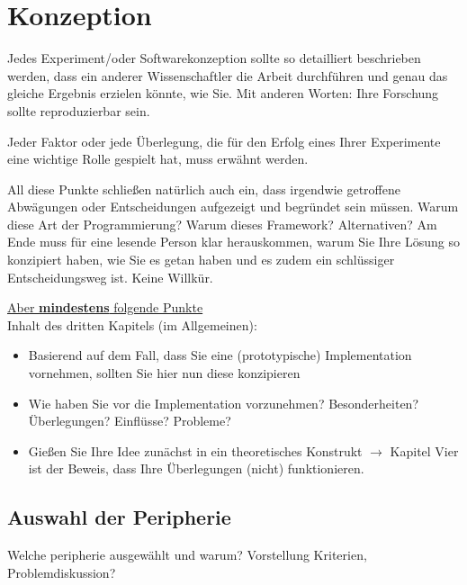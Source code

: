 

\clearpage
\chapter{Konzeption}

Jedes Experiment/oder Softwarekonzeption sollte so detailliert beschrieben werden, dass ein anderer Wissenschaftler die Arbeit durchführen und genau das gleiche Ergebnis erzielen könnte, wie Sie. 
Mit anderen Worten: Ihre Forschung sollte reproduzierbar sein.

Jeder Faktor oder jede Überlegung, die für den Erfolg eines Ihrer Experimente eine wichtige Rolle gespielt hat, muss erwähnt werden.

All diese Punkte schließen natürlich auch ein, dass irgendwie getroffene Abwägungen oder Entscheidungen aufgezeigt und begründet sein müssen. Warum diese Art der Programmierung? Warum dieses Framework?
Alternativen? Am Ende muss für eine lesende Person klar herauskommen, warum Sie Ihre Lösung so konzipiert haben, wie Sie es getan haben und es zudem ein schlüssiger Entscheidungsweg ist. Keine Willkür.

\underline{Aber \textbf{mindestens} folgende Punkte}\\
Inhalt des dritten Kapitels (im Allgemeinen):
\begin{itemize}
    \item Basierend auf dem Fall, dass Sie eine (prototypische) Implementation vornehmen, sollten Sie hier nun diese konzipieren
    \item Wie haben Sie vor die Implementation vorzunehmen? Besonderheiten? Überlegungen? Einflüsse? Probleme?
    \item Gießen Sie Ihre Idee zunächst in ein theoretisches Konstrukt $\rightarrow$ Kapitel Vier ist der Beweis, dass Ihre Überlegungen (nicht) funktionieren.
\end{itemize}


\section{Auswahl der Peripherie}
Welche peripherie ausgewählt und warum?
Vorstellung Kriterien, Problemdiskussion?

